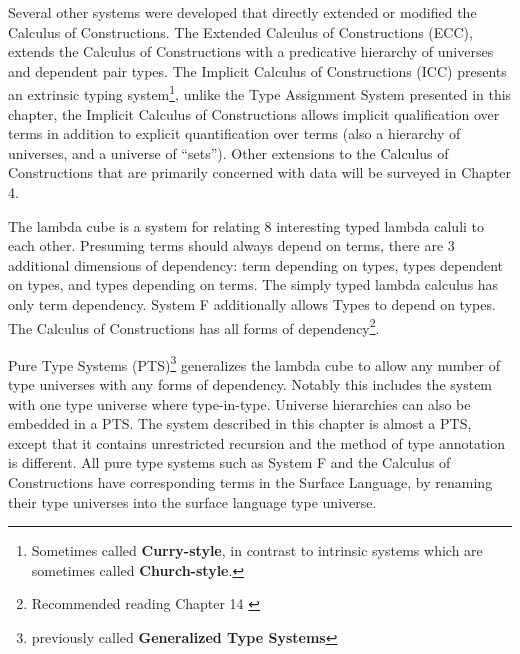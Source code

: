Several other systems were developed that directly extended or modified the Calculus of Constructions.
The Extended Calculus of Constructions (\ac{ECC})\cite{luo1990extended,luo1994computation}, extends the Calculus of Constructions with a predicative hierarchy of universes and dependent pair types.
The Implicit Calculus of Constructions (\ac{ICC})\cite{10.1007/3-540-45413-6_27,10.1007/978-3-540-78499-9_26} presents an extrinsic typing system\footnote{
  Sometimes called \textbf{Curry-style}, in contrast to intrinsic systems which are sometimes called \textbf{Church-style}.
  }, unlike the Type Assignment System presented in this chapter, the Implicit Calculus of Constructions allows implicit qualification over terms in addition to explicit quantification over terms (also a hierarchy of universes, and a universe of ``sets'').
Other extensions to the Calculus of Constructions that are primarily concerned with data will be surveyed in Chapter 4.

The lambda cube is a system for relating 8 interesting typed lambda caluli to each other.
Presuming terms should always depend on terms, there are 3 additional dimensions of dependency: term depending on types, types dependent on types, and types depending on terms.
The simply typed lambda calculus has only term dependency.
System F additionally allows Types to depend on types.
The Calculus of Constructions has all forms of dependency\footnote{Recommended reading Chapter 14 \cite{sorensen2006lectures}}.

Pure Type Systems (\ac{PTS})\footnote{previously called \textbf{Generalized Type Systems}} generalizes the lambda cube to allow any number of type universes with any forms of dependency.
Notably this includes the system with one type universe where type-in-type.
Universe hierarchies can also be embedded in a \ac{PTS}.
The system described in this chapter is almost a \ac{PTS}, except that it contains unrestricted recursion and the method of type annotation is different.
All pure type systems such as System F and the Calculus of Constructions have corresponding terms in the Surface Language, by renaming their type universes into the surface language type universe.


